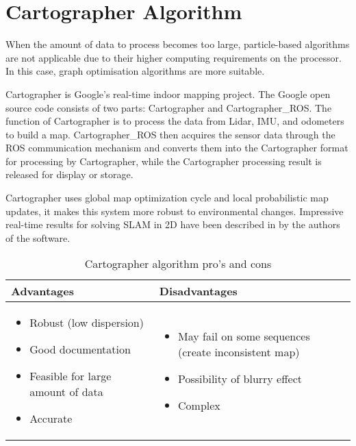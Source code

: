 \documentclass[12pt, a4paper, onecolumn]{article}
\begin{document}
\section{Cartographer Algorithm}
When the amount of data to process becomes too large, particle-based algorithms are not applicable due to their higher computing requirements on the processor. In this case, graph optimisation algorithms are more suitable.\cite{2DSLAM20}\par
Cartographer is Google's real-time indoor mapping project. The Google open source code consists of two parts: Cartographer and Cartographer{\_}ROS. The function of Cartographer is to process the data from Lidar, IMU, and odometers to build a map. Cartographer{\_}ROS then acquires the sensor data through the ROS communication mechanism and converts them into the Cartographer format for processing by Cartographer, while the Cartographer processing result is released for display or storage. \cite{2DSLAM20} \par Cartographer uses global map optimization cycle and local probabilistic map updates, it makes this system more robust to environmental changes. 
Impressive real-time results for solving SLAM in 2D have been described in \cite{CARTO16} by the authors of the software.
\begin{table}[h!]
\centering
\begin{tabular}{ |p{}||p{}|  }
 \hline
 Advantages&Disadvantages\\
 \hline
\begin{itemize}
  \item Robust (low dispersion) \cite{SLAMQuality}
  \item Good documentation
  \item Feasible for large amount of data
  \item Accurate \cite{SLAMQuality}
  \end{itemize} 
  & 
  \begin{itemize}
  \item May fail on some sequences (create inconsistent map)\cite{SLAMQuality}
  \item Possibility of blurry effect \cite{SLAMQuality}
  \item Complex
  \end{itemize} \\

 \hline
\end{tabular}
\caption{Cartographer algorithm pro's and cons }
\label{table:1}
\end{table}
\end{document}

